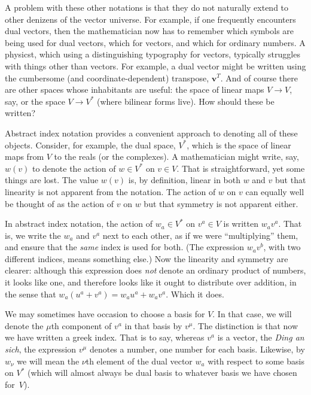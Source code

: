 \documentclass[10pt, a4paper]{article}
\begin{document}
A problem with these other notations is that they do not naturally
extend to other denizens of the vector universe. For example, if one
frequently encounters dual vectors, then the mathematician now has to
remember which symbols are being used for dual vectors, which for
vectors, and which for ordinary numbers. A physicst, which using a
distinguishing typography for vectors, typically struggles with things
other than vectors. For example, a dual vector might be written using
the cumbersome (and coordinate-dependent) transpose,
$\mathbold{v}^T$.
And of course there are other spaces whose inhabitants are useful: the
space of linear maps $V\to V$, say, or the space $V\to V^*$ (where
bilinear forms live). How should these be written?

Abstract index notation provides a convenient approach to denoting all
of these objects. Consider, for example, the dual space, $V^*$, which
is the space of linear maps from $V$ to the reals (or the
complexes). A mathematician might write, say, $w(v)$ to denote the
action of $w\in V^*$ on $v\in V$. That is straightforward, yet some things
are lost. The value $w(v)$ is, by definition, linear in both $w$ and
$v$ but that linearity is not apparent from the notation. The action
of $w$ on $v$ can equally well be thought of as the action of $v$ on
$w$ but that symmetry is not apparent either.

In abstract index notation, the action of $w_a\in V^*$ on $v^a\in V$ is
written $w_av^a$. That is, we write the $w_a$ and $v^a$ next to each
other, as if we were “multiplying” them, and ensure that the
\emph{same} index is used for both. (The expression $w_av^b$, with two
different indices, means something else.) Now the linearity and
symmetry are clearer: although this expression does \emph{not} denote
an ordinary product of numbers, it looks like one, and therefore looks
like it ought to distribute over addition, in the sense that
$w_a(u^a+v^a) = w_au^a + w_av^a$. Which it does.

We may sometimes have occasion to choose a basis for $V$. In that
case, we will denote the $\mu$th component of $v^a$ in that basis by
$v^\mu$. The distinction is that now we have written a greek index. That
is to say, whereas $v^a$ is a vector, the \emph{Ding an sich}, the
expression $v^\mu$ denotes a number, one number for each
basis. Likewise, by $w_\nu$ we will mean the $\nu$th element of the dual
vector $w_a$ with respect to some basis on $V^*$ (which will almost
always be dual basis to whatever basis we have chosen for~$V$).
\end{document}
